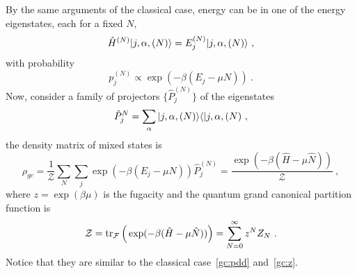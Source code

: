     By the same arguments of the classical case, energy can be in one of the energy eigenstates, each for a fixed $N$,
    \begin{equation*}
        \hat H^{(N)} \vert j, \alpha, (N)\rangle = E_j^{(N)} \vert j, \alpha, (N)\rangle ~,
    \end{equation*}
    with probability 
    \begin{equation}\label{prob2}
        p_j^{(N)} \propto \exp(- \beta (E_j - \mu N)) ~.
    \end{equation}
    Now, consider a family of projectors $\{\hat P_j^{(N)}\}$ of the eigenstates
    \begin{equation*}
        \hat P_j^{N} = \sum_\alpha \vert j, \alpha, (N)\rangle \langle\vert{j, \alpha, (N)} ~,
    \end{equation*}  
    the density matrix of mixed states is 
    \begin{equation*}
        \rho_{gc} = \frac{1}{\mathcal Z} \sum_N \sum_j \exp(- \beta (E_j - \mu N)) \hat P_j^{(N)} = \frac{\exp(- \beta (\hat H - \mu \hat N))}{\mathcal Z} ~,
    \end{equation*}
    where $z = \exp(\beta \mu)$ is the fugacity and the quantum grand canonical partition function is 
    \begin{equation*}
        \mathcal Z = \operatorname{tr}_{\mathcal F} \Big ( \exp(- \beta (\hat H - \mu \hat N)) \Big) = \sum_{N=0}^\infty z^N Z_N ~.
    \end{equation*}
    Notice that they are similar to the classical case~\eqref{gc:pdd} and~\eqref{gc:z}.
